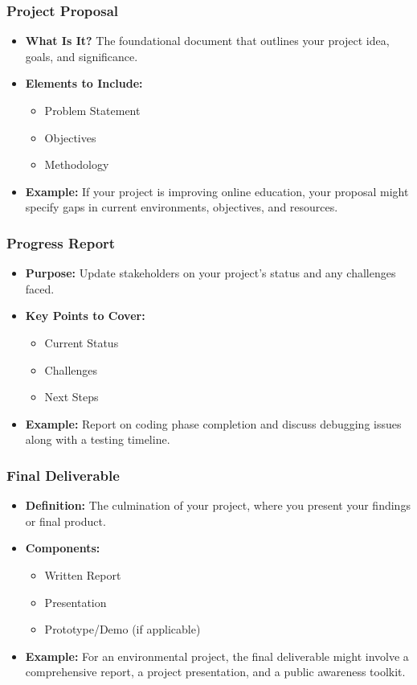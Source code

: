 \documentclass[aspectratio=169]{beamer}
\begin{document}
\begin{frame}[fragile]
    \frametitle{Project Proposal}
    \begin{itemize}
        \item \textbf{What Is It?} The foundational document that outlines your project idea, goals, and significance.
        \item \textbf{Elements to Include:}
        \begin{itemize}
            \item Problem Statement
            \item Objectives
            \item Methodology
        \end{itemize}
        \item \textbf{Example:} If your project is improving online education, your proposal might specify gaps in current environments, objectives, and resources.
    \end{itemize}
\end{frame}

\begin{frame}[fragile]
    \frametitle{Progress Report}
    \begin{itemize}
        \item \textbf{Purpose:} Update stakeholders on your project's status and any challenges faced.
        \item \textbf{Key Points to Cover:}
        \begin{itemize}
            \item Current Status
            \item Challenges
            \item Next Steps
        \end{itemize}
        \item \textbf{Example:} Report on coding phase completion and discuss debugging issues along with a testing timeline.
    \end{itemize}
\end{frame}

\begin{frame}[fragile]
    \frametitle{Final Deliverable}
    \begin{itemize}
        \item \textbf{Definition:} The culmination of your project, where you present your findings or final product.
        \item \textbf{Components:}
        \begin{itemize}
            \item Written Report
            \item Presentation
            \item Prototype/Demo (if applicable)
        \end{itemize}
        \item \textbf{Example:} For an environmental project, the final deliverable might involve a comprehensive report, a project presentation, and a public awareness toolkit.
    \end{itemize}
\end{frame}
\end{document}
